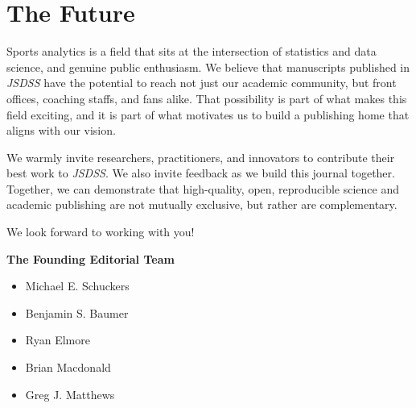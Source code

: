 \documentclass[
  12pt]{article}
\providecommand{\tightlist}{%
  \setlength{\itemsep}{0pt}\setlength{\parskip}{0pt}}
\begin{document}
\section{The Future}\label{the-future}

Sports analytics is a field that sits at the intersection of statistics
and data science, and genuine public enthusiasm. We believe that
manuscripts published in \emph{JSDSS} have the potential to reach not
just our academic community, but front offices, coaching staffs, and
fans alike. That possibility is part of what makes this field exciting,
and it is part of what motivates us to build a publishing home that
aligns with our vision.

We warmly invite researchers, practitioners, and innovators to
contribute their best work to \emph{JSDSS}. We also invite feedback as
we build this journal together. Together, we can demonstrate that
high-quality, open, reproducible science and academic publishing are not
mutually exclusive, but rather are complementary.

We look forward to working with you!

\textbf{The Founding Editorial Team}

\begin{itemize}
\tightlist
\item
  Michael E. Schuckers
\item
  Benjamin S. Baumer
\item
  Ryan Elmore
\item
  Brian Macdonald
\item
  Greg J. Matthews
\end{itemize}



\end{document}
